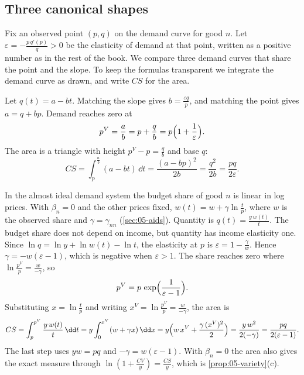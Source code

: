 \subsection{Three canonical shapes}\label{sec:10-shapes}

Fix an observed point $(p,q)$ on the demand curve for good $n$. Let $\varepsilon = -\frac{p\,q'(p)}{q} > 0$
be the elasticity of demand at that point, written as a positive number as in the rest of the book. We compare
three demand curves that share the point and the slope. To keep the formulas transparent we integrate the
demand curve as drawn, and write $CS$ for the area.

Let $q(t) = a - bt$. Matching the slope gives $b = \frac{\varepsilon q}{p}$, and matching the point gives
$a = q + bp$. Demand reaches zero at
\begin{equation*}
  p^V = \frac{a}{b} = p + \frac{q}{b} = p\Bigl(1 + \frac{1}{\varepsilon}\Bigr).
\end{equation*}
The area is a triangle with height $p^V - p = \frac{q}{b}$ and base $q$:
\begin{equation*}
  CS = \int_p^{\frac{a}{b}}(a - bt)\,\dd t = \frac{(a - bp)^2}{2b} = \frac{q^2}{2b} = \frac{pq}{2\varepsilon}.
\end{equation*}

In the almost ideal demand system the budget share of good $n$ is linear in log prices. With $\beta_n = 0$ and
the other prices fixed, $w(t) = w + \gamma\ln\frac{t}{p}$, where $w$ is the observed share and $\gamma =
\gamma_{nn}$ (\cref{sec:05-aids}). Quantity is $q(t) = \frac{y\,w(t)}{t}$. The budget share does not depend on income, but quantity
has income elasticity one. Since $\ln q = \ln y + \ln w(t) -
\ln t$, the elasticity at $p$ is $\varepsilon = 1 - \frac{\gamma}{w}$. Hence $\gamma = -w(\varepsilon - 1)$,
which is negative when $\varepsilon > 1$. The share reaches zero where $\ln\frac{p^V}{p} = \frac{w}{-\gamma}$,
so
\begin{equation*}
  p^V = p\,\exp\Bigl(\frac{1}{\varepsilon - 1}\Bigr).
\end{equation*}
Substituting $x = \ln\frac{t}{p}$ and writing $x^V = \ln\frac{p^V}{p} = \frac{w}{-\gamma}$, the area is
\begin{equation*}
  CS = \int_p^{p^V}\frac{y\,w(t)}{t}\,\dd t = y\int_0^{x^V}(w + \gamma x)\,\dd x
  = y\Bigl(w\,x^V + \frac{\gamma\,(x^V)^2}{2}\Bigr) = \frac{y\,w^2}{2(-\gamma)} = \frac{pq}{2(\varepsilon - 1)}.
\end{equation*}
The last step uses $yw = pq$ and $-\gamma = w(\varepsilon - 1)$. With $\beta_n = 0$ the area also gives the
exact measure through $\ln(1 + \frac{CV}{y}) = \frac{CS}{y}$, which is \cref{prop:05-variety}(c).

